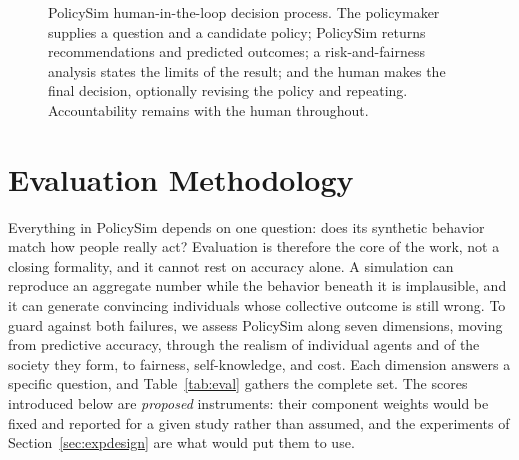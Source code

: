 \documentclass[conference]{IEEEtran}
\begin{document}
\begin{figure}[!t]
\centering
{}
\caption{PolicySim human-in-the-loop decision process. The policymaker supplies a question and a candidate policy; PolicySim returns recommendations and predicted outcomes; a risk-and-fairness analysis states the limits of the result; and the human makes the final decision, optionally revising the policy and repeating. Accountability remains with the human throughout.}
\label{fig:hitl}
\end{figure}

\section{Evaluation Methodology}
\label{sec:eval}

Everything in PolicySim depends on one question: does its synthetic behavior match how people really act? Evaluation is therefore the core of the work, not a closing formality, and it cannot rest on accuracy alone. A simulation can reproduce an aggregate number while the behavior beneath it is implausible, and it can generate convincing individuals whose collective outcome is still wrong. To guard against both failures, we assess PolicySim along seven dimensions, moving from predictive accuracy, through the realism of individual agents and of the society they form, to fairness, self-knowledge, and cost. Each dimension answers a specific question, and Table~\ref{tab:eval} gathers the complete set. The scores introduced below are \emph{proposed} instruments: their component weights would be fixed and reported for a given study rather than assumed, and the experiments of Section~\ref{sec:expdesign} are what would put them to use.
\end{document}
